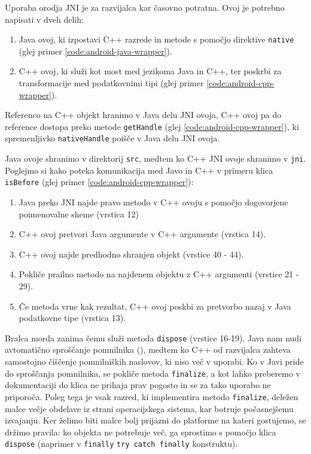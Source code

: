 Uporaba orodja JNI je za razvijalca kar časovno potratna. Ovoj je potrebno napisati v dveh delih:

\begin{enumerate}
  \item Java ovoj, ki izpostavi C++ razrede in metode s pomočjo direktive \texttt{native} (glej primer \ref{code:android-java-wrapper}).
  \item C++ ovoj, ki služi kot most med jezikoma Java in C++, ter poskrbi za transformacije med podatkovnimi tipi (glej primer \ref{code:android-cpp-wrapper}).
\end{enumerate}

Referenco na C++ objekt hranimo v Java delu JNI ovoja, C++ ovoj pa do reference dostopa preko metode \texttt{getHandle} (glej \ref{code:android-cpp-wrapper}), ki spremenljivko \texttt{nativeHandle} poišče v Java delu JNI ovoja.

Java ovoje shranimo v direktorij \texttt{src}, medtem ko C++ JNI ovoje shranimo v \texttt{jni}. Poglejmo si kako poteka komunikacija med Javo in C++ v primeru klica \texttt{isBefore} (glej primer \ref{code:android-cpp-wrapper}):

\begin{enumerate}
  \item Java preko JNI najde pravo metodo v C++ ovoju s pomočjo dogovorjene poimenovalne sheme (vrstica 12)
  \item C++ ovoj pretvori Java argumente v C++ argumente (vrstica 14).
  \item C++ ovoj najde predhodno shranjen objekt (vrstice 40 - 44).
  \item Pokliče prailno metodo na najdenem objektu z C++ argumenti (vrstice 21 - 29).
  \item Če metoda vrne kak rezultat, C++ ovoj poskbi za pretvorbo nazaj v Java podatkovne tipe (vrstica 13).
\end{enumerate}

Bralca morda zanima čemu služi metoda \texttt{dispose} (vrstice 16-19). Java nam nudi avtomatično sproščanje pomnilnika (), medtem ko C++ od razvijalca zahteva samostojno čiščenje pomnilniških naslovov, ki niso več v uporabi. Ko v Javi pride do sproščanja pomnilnika, se pokliče metoda \texttt{finalize}, a kot lahko preberemo v dokumentaciji\cite{android-object} do klica ne prihaja prav pogosto in se za tako uporabo ne priporoča. Poleg tega je vsak razred, ki implementira metodo \texttt{finalize}, deležen malce večje obdelave iz strani operacijskega sistema, kar botruje počasnejšemu izvajanju. Ker želimo biti malce bolj prijazni do platforme na kateri gostujemo, se držimo pravila: ko objekta ne potrebuje več, ga sprostimo s pomočjo klica \texttt{dispose} (naprimer v \texttt{finally} \texttt{try catch finally} konstruktu).

